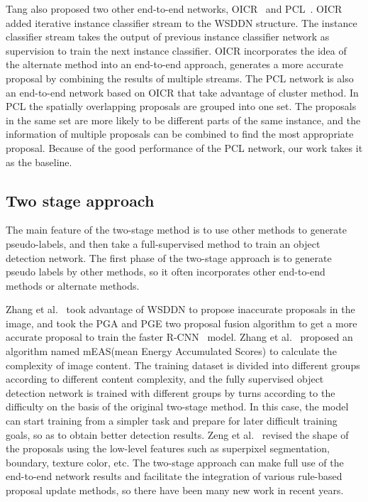 \documentclass[final,3p,times,twocolumn]{elsarticle}
\begin{document}
Tang also proposed two other end-to-end networks, OICR~\cite{tang2017multiple} and PCL~\cite{tang2018pcl}. OICR added iterative instance classifier stream to the WSDDN structure. The instance classifier stream takes the output of previous instance classifier network as supervision to train the next instance classifier. OICR incorporates the idea of the alternate method into an end-to-end approach, generates a more accurate proposal by combining the results of multiple streams. The PCL network is also an end-to-end network based on OICR that take advantage of cluster method. In PCL the spatially overlapping proposals are grouped into one set. The proposals in the same set are more likely to be different parts of the same instance, and the information of multiple proposals can be combined to find the most appropriate proposal. Because of the good performance of the PCL network, our work takes it as the baseline.

\subsection{Two stage approach}
The main feature of the two-stage method is to use other methods to generate pseudo-labels, and then take a full-supervised method to train an object detection network. The first phase of the two-stage approach is to generate pseudo labels by other methods, so it often incorporates other end-to-end methods or alternate methods.

Zhang et al.~\cite{zhang2018w2f} took advantage of WSDDN to propose inaccurate proposals in the image, and took the PGA and PGE two proposal fusion algorithm to get a more accurate proposal to train the faster R-CNN~\cite{ren2015faster} model. Zhang et al.~\cite{zhang2018zigzag} proposed an algorithm named mEAS(mean Energy Accumulated Scores) to calculate the complexity of image content. The training dataset is divided into different groups according to different content complexity, and the fully supervised object detection network is trained with different groups by turns according to the difficulty on the basis of the original two-stage method. In this case, the model can start training from a simpler task and prepare for later difficult training goals, so as to obtain better detection results. Zeng et al.~\cite{zeng2019wsod2} revised the shape of the proposals using the low-level features such as superpixel segmentation, boundary, texture color, etc. The two-stage approach can make full use of the end-to-end network results and facilitate the integration of various rule-based proposal update methods, so there have been many new work in recent years.
\end{document}
